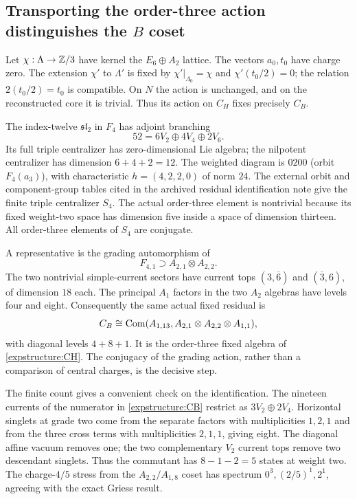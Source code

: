\subsection{Transporting the order-three action distinguishes the \texorpdfstring{$B$}{B} coset}

Let $\chi:\Lambda\to\mathbb Z/3$ have kernel the $E_6\oplus A_2$
lattice. The vectors $a_0,t_0$ have charge zero. The extension
$\chi'$ to $\Lambda'$ is fixed by
$\chi'|_{\Lambda_0}=\chi$ and $\chi'(t_0/2)=0$; the relation
$2(t_0/2)=t_0$ is compatible. On $N$ the action is unchanged,
and on the reconstructed core it is trivial. Thus its action on
$C_H$ fixes precisely $C_B$.

The index-twelve $\mathfrak{sl}_2$ in $F_4$ has adjoint branching
\[
 52=6V_2\oplus4V_4\oplus2V_6.
\]
Its full triple centralizer has zero-dimensional Lie algebra;
the nilpotent centralizer has dimension $6+4+2=12$.
The weighted diagram is $0200$ (orbit $F_4(a_3)$), with
characteristic $h=(4,2,2,0)$ of norm $24$. The external orbit
and component-group tables cited in the archived residual
identification note give the finite triple centralizer $S_4$.
The actual order-three element is nontrivial because its fixed
weight-two space has dimension five inside a space of dimension
thirteen. All order-three elements of $S_4$ are conjugate.

A representative is the grading automorphism of
\[
 F_{4,1}\supset A_{2,1}\otimes A_{2,2}.
\]
The two nontrivial simple-current sectors have current tops
$(3,\overline6)$ and $(\overline3,6)$, of dimension $18$ each.
The principal $A_1$ factors in the two $A_2$ algebras have levels
four and eight. Consequently the same actual fixed residual is
\begin{equation}
 C_B\cong\operatorname{Com}(A_{1,13},
             A_{2,1}\otimes A_{2,2}\otimes A_{1,1}),
 \label{expstructure:CB}
\end{equation}
with diagonal levels $4+8+1$. It is the order-three fixed algebra
of \eqref{expstructure:CH}. The conjugacy of the grading action,
rather than a comparison of central charges, is the decisive step.

The finite count gives a convenient check on the identification.
The nineteen currents of the numerator in \eqref{expstructure:CB}
restrict as $3V_2\oplus2V_4$. Horizontal singlets at grade two
come from the separate factors with multiplicities $1,2,1$ and
from the three cross terms with multiplicities $2,1,1$, giving
eight. The diagonal affine vacuum removes one; the two
complementary $V_2$ current tops remove two descendant singlets.
Thus the commutant has $8-1-2=5$ states at weight two.
The charge-$4/5$ stress from the $A_{2,2}/A_{1,8}$ coset has
spectrum $0^3,(2/5)^1,2^1$, agreeing with the exact Griess result.

